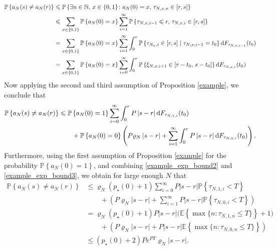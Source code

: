 \documentclass[11pt,reqno]{amsart}
\numberwithin{equation}{section}
\newcommand{\abs}[1]{\left\lvert #1 \right\rvert}
\newcommand{\E}[1]{\mathbb{E}\left\{ #1\right\}}
\newcommand{\pk}[1]{\mathbb{P} \left\{ #1 \right \} }
\newcommand{\N}{\mathbb{N}}
\newcommand{\neprop}[1]{{Proposition \ref{#1}}}
\def\td{\text{\rm d}}
\begin{document}
\begin{align*}
    \pk{a_N(s)\not= a_N(r)} &\leqslant \pk{\exists n\in\N,\, x\in\{0,1\}\colon a_N(0)=x,\,\tau_{N,x,n}\in[r,s]}\\
    &\leqslant \sum_{{x\in\{0,1\}}}\pk{a_N(0)=x}\sum_{i=1}^{\infty} \pk{\tau_{N,x,i-1}\leqslant r,\, \tau_{N,x,i}\in[r,s]}\\
    &= \sum_{{x\in\{0,1\}}}\pk{a_N(0)=x}\sum_{i=1}^{\infty} \int_{0}^{r}\pk{\tau_{N_x,i}\in[r,s] \mid\tau_{N,x,i-1}=t_0}\td F_{\tau_{N,x,i-1}}(t_0)\\
    &= \sum_{{x\in\{0,1\}}}\pk{a_N(0)=x}\sum_{{i=0}}^{\infty} \int_{0}^{r}\pk{\xi_{N,x,{i+1}}\in[r-t_0,\, s-t_0]}\td F_{\tau_{N,x,{i}}}(t_0)
\end{align*}
{Now applying the second and third assumption of \neprop{example}, we conclude that}
\begin{align*}
     \pk{a_N(s)\not= a_N(r)}&\leqslant \pk{a_N(0)=1}\sum_{{i=0}}^{\infty} \int_{0}^{r}P\abs{s-r}\td F_{\tau_{N,1,{i}}}(t_0)\\
    &\qquad + \pk{a_N(0)=0}\left(P\varrho_N\abs{s-r} + \sum_{i=1}^{\infty} \int_{0}^{r}P\abs{s-r}\td F_{\tau_{N,0,i}}(t_0)\right).
\end{align*}
Furthermore, using the first assumption of \neprop{example} for the probability $\pk{a_N(0)=1}$, and combining \eqref{example_exp_bound2} and \eqref{example_exp_bound3}, we obtain for large enough $N$ that
\begin{align*}
    \pk{a_N(s)\not= a_N(r)}&\leqslant \varrho_N(p_{\star}(0)+1)\sum_{{i=0}}^{\infty}P\abs{s-r}\pk{\tau_{N,1,{i}}<T}\\
    &\qquad + \left(P\varrho_N\abs{s-r} + \sum_{i=1}^{\infty}P\abs{s-r}\pk{\tau_{N,0,i}<T}\right)\\
    &= \varrho_N(p_{\star}(0)+1)P\abs{s-r}\bigl(\E{\max\{n\colon \tau_{N,1,n}\leqslant T\}}+1\bigr)\\
    &\qquad + \left(P\varrho_N\abs{s-r} + P\abs{s-r}\E{\max\{n\colon \tau_{N,0,n}\leqslant T\}}\right)\\
    &\leqslant (p_{\star}(0)+2)Pe^{PT}\varrho_N\abs{s-r}.
\end{align*}
\end{document}
